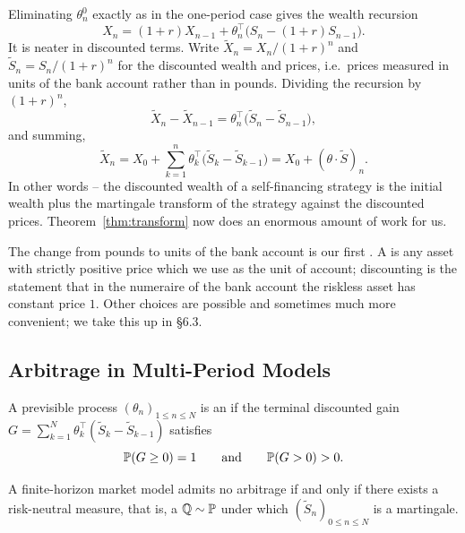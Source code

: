 \documentclass[a4paper]{scrartcl}
\newcommand{\QQ}{\mathbb{Q}}
\begin{document}
Eliminating $\theta_n^0$ exactly as in the one-period case gives the wealth recursion
$$
X_n = (1+r)X_{n-1} + \theta_n^\top\big(S_n - (1+r)S_{n-1}\big).
$$
It is neater in discounted terms. Write $\tilde X_n = X_n/(1+r)^n$ and $\tilde S_n = S_n/(1+r)^n$ for the discounted wealth and prices, i.e.\ prices measured in units of the bank account rather than in pounds. Dividing the recursion by $(1+r)^n$,
$$
\tilde X_n - \tilde X_{n-1} = \theta_n^\top\big(\tilde S_n - \tilde S_{n-1}\big),
$$
and summing,
$$
\boxed{\;\tilde X_n = X_0 + \sum_{k=1}^n \theta_k^\top\big(\tilde S_k - \tilde S_{k-1}\big) = X_0 + (\theta\cdot\tilde S)_n.\;}
$$
In other words -- the discounted wealth of a self-financing strategy is the initial wealth plus the martingale transform of the strategy against the discounted prices. Theorem~\ref{thm:transform} now does an enormous amount of work for us.

\begin{remark}
	The change from pounds to units of the bank account is our first . A  is any asset with strictly positive price which we use as the unit of account; discounting is the statement that in the numeraire of the bank account the riskless asset has constant price $1$. Other choices are possible and sometimes much more convenient; we take this up in \S6.3.
\end{remark}

\subsection{Arbitrage in Multi-Period Models}

\begin{definition}[Arbitrage]
	A previsible process $(\theta_n)_{1\leq n\leq N}$ is an  if the terminal discounted gain $G = \sum_{k=1}^N \theta_k^\top(\tilde S_k - \tilde S_{k-1})$ satisfies
	$$
	\mathbb{P}(G \geq 0) = 1 \qquad\text{and}\qquad \mathbb{P}(G>0)>0.
	$$
\end{definition}

\begin{theorem}\label{thm:ftap-multi}
	A finite-horizon market model admits no arbitrage if and only if there exists a risk-neutral measure, that is, a $\QQ\sim\PP$ under which $(\tilde S_n)_{0\leq n\leq N}$ is a martingale.
\end{theorem}
\end{document}
